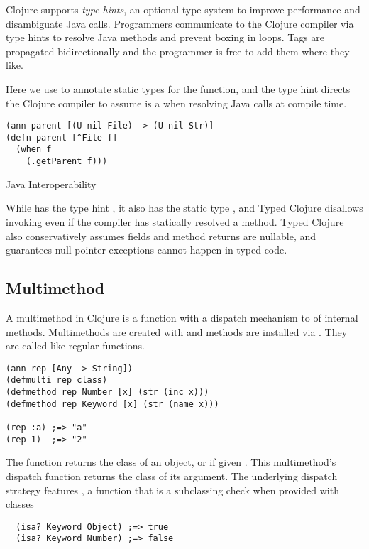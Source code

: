 Clojure supports \emph{type hints}, an optional type system to improve performance
and disambiguate Java calls.
Programmers communicate to the Clojure compiler via type hints
to resolve Java methods and prevent boxing in loops. Tags are propagated bidirectionally
and the programmer is free to add them where they like.

Here we use  to annotate static types for the function, and the type hint
 directs the Clojure compiler to assume  is a 
when resolving Java calls at compile time.

\begin{listing}
  \begin{verbatim}
(ann parent [(U nil File) -> (U nil Str)]
(defn parent [^File f]
  (when f
    (.getParent f)))
  \end{verbatim}
\caption{Java Interoperability}
\end{listing}

While  has the type hint , it also has the static type ,
and Typed Clojure disallows invoking  even if the compiler
has statically resolved a method.
Typed Clojure also conservatively assumes fields and method returns are nullable,
and guarantees null-pointer exceptions cannot happen in typed code.

\subsection{Multimethod}

A multimethod in Clojure is a function with a dispatch mechanism to
of internal methods. Multimethods are created with {}
and methods are installed via {}.
They are called like regular functions.

\begin{verbatim}
(ann rep [Any -> String])
(defmulti rep class)
(defmethod rep Number [x] (str (inc x)))
(defmethod rep Keyword [x] (str (name x)))

(rep :a) ;=> "a"
(rep 1)  ;=> "2"
\end{verbatim}

The  function returns the class of an object, or 
if given . This multimethod's dispatch function returns the class of its
argument. The underlying dispatch strategy features , a function
that is a subclassing check when provided with classes

\begin{verbatim}
  (isa? Keyword Object) ;=> true
  (isa? Keyword Number) ;=> false
\end{verbatim}


